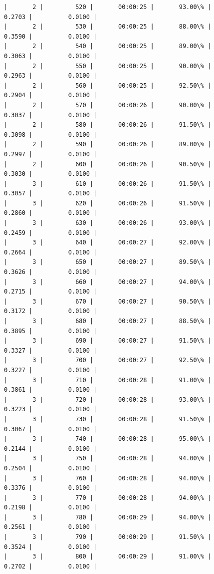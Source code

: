 \documentclass[11pt]{article}
\begin{document}
\begin{Verbatim}[commandchars=\\\{\}]
|       2 |         520 |       00:00:25 |       93.00\% |       0.2703 |          0.0100 |
|       2 |         530 |       00:00:25 |       88.00\% |       0.3590 |          0.0100 |
|       2 |         540 |       00:00:25 |       89.00\% |       0.3063 |          0.0100 |
|       2 |         550 |       00:00:25 |       90.00\% |       0.2963 |          0.0100 |
|       2 |         560 |       00:00:25 |       92.50\% |       0.2904 |          0.0100 |
|       2 |         570 |       00:00:26 |       90.00\% |       0.3037 |          0.0100 |
|       2 |         580 |       00:00:26 |       91.50\% |       0.3098 |          0.0100 |
|       2 |         590 |       00:00:26 |       89.00\% |       0.2997 |          0.0100 |
|       2 |         600 |       00:00:26 |       90.50\% |       0.3030 |          0.0100 |
|       3 |         610 |       00:00:26 |       91.50\% |       0.3057 |          0.0100 |
|       3 |         620 |       00:00:26 |       91.50\% |       0.2860 |          0.0100 |
|       3 |         630 |       00:00:26 |       93.00\% |       0.2459 |          0.0100 |
|       3 |         640 |       00:00:27 |       92.00\% |       0.2664 |          0.0100 |
|       3 |         650 |       00:00:27 |       89.50\% |       0.3626 |          0.0100 |
|       3 |         660 |       00:00:27 |       94.00\% |       0.2715 |          0.0100 |
|       3 |         670 |       00:00:27 |       90.50\% |       0.3172 |          0.0100 |
|       3 |         680 |       00:00:27 |       88.50\% |       0.3895 |          0.0100 |
|       3 |         690 |       00:00:27 |       91.50\% |       0.3327 |          0.0100 |
|       3 |         700 |       00:00:27 |       92.50\% |       0.3227 |          0.0100 |
|       3 |         710 |       00:00:28 |       91.00\% |       0.3861 |          0.0100 |
|       3 |         720 |       00:00:28 |       93.00\% |       0.3223 |          0.0100 |
|       3 |         730 |       00:00:28 |       91.50\% |       0.3067 |          0.0100 |
|       3 |         740 |       00:00:28 |       95.00\% |       0.2144 |          0.0100 |
|       3 |         750 |       00:00:28 |       94.00\% |       0.2504 |          0.0100 |
|       3 |         760 |       00:00:28 |       94.00\% |       0.3376 |          0.0100 |
|       3 |         770 |       00:00:28 |       94.00\% |       0.2198 |          0.0100 |
|       3 |         780 |       00:00:29 |       94.00\% |       0.2561 |          0.0100 |
|       3 |         790 |       00:00:29 |       91.50\% |       0.3524 |          0.0100 |
|       3 |         800 |       00:00:29 |       91.00\% |       0.2702 |          0.0100 |

\end{Verbatim}
\end{document}

